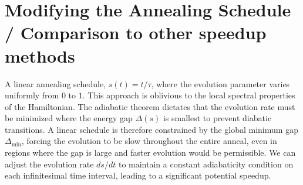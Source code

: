 \chapter{Modifying the Annealing Schedule / Comparison to other speedup methods}\label{Ch6:ModifyingSchedule}

\qquad  A linear annealing schedule, $s(t) = t/\tau$, where the evolution parameter varies uniformly from $0$ to $1$. This approach is oblivious to the local spectral properties of the Hamiltonian. The adiabatic theorem dictates that the evolution rate must be minimized where the energy gap $\Delta(s)$ is smallest to prevent diabatic transitions. A linear schedule is therefore constrained by the global minimum gap $\Delta_{\min}$, forcing the evolution to be slow throughout the entire anneal, even in regions where the gap is large and faster evolution would be permissible. We can adjust the evolution rate $ds/dt$ to maintain a constant adiabaticity condition on each infinitesimal time interval, leading to a significant potential speedup\cite{LocalAdiabticQuantumSearch, MoritaNishimori2008}.

